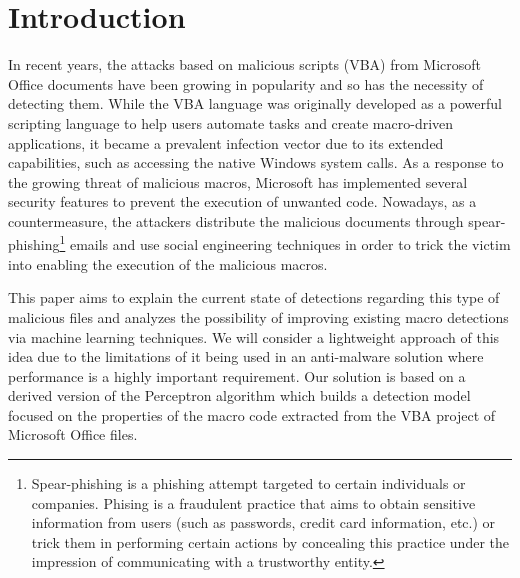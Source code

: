 \section{Introduction}
In recent years, the attacks based on malicious scripts (VBA) from Microsoft Office documents have been growing in popularity and so has the necessity of detecting them. While the VBA language was originally developed as a powerful scripting language to help users automate tasks and create macro-driven applications, it became a prevalent infection vector due to its extended capabilities, such as accessing the native Windows system calls. As a response to the growing threat of malicious macros, Microsoft has implemented several security features to prevent the execution of unwanted code. Nowadays, as a countermeasure, the attackers distribute the malicious documents through spear-phishing\footnote{Spear-phishing is a phishing attempt targeted to certain individuals or companies. Phising is a fraudulent practice that aims to obtain sensitive information from users (such as passwords, credit card information, etc.) or trick them in performing certain actions  by concealing this practice under the impression of communicating with a trustworthy entity.} emails and use social engineering techniques in order to trick the victim into enabling the execution of the malicious macros.
\par
This paper aims to explain the current state of detections regarding this type of malicious files and analyzes the possibility of improving existing macro detections via machine learning techniques. We will consider a lightweight approach of this idea due to the limitations of it being used in an anti-malware solution where performance is a highly important requirement. Our solution is based on a derived version of the Perceptron algorithm which builds a detection model focused on the properties of the macro code extracted from the VBA project of Microsoft Office files.